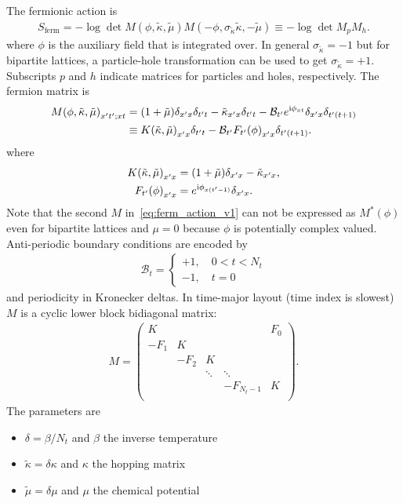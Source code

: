 \documentclass[a4paper, fleqn, twoside, notitlepage]{scrartcl}
\begin{document}
The fermionic action is
\begin{align}
  S_\text{ferm} = - \log \det M(\phi, \tilde{\kappa}, \tilde{\mu}) M(-\phi, \sigma_{\tilde{\kappa}}\tilde{\kappa}, -\tilde{\mu}) \equiv - \log \det M_p M_h.\label{eq:ferm_action_v1}
\end{align}
where $\phi$ is the auxiliary field that is integrated over. In general $\sigma_{\tilde{\kappa}} = -1$ but for bipartite lattices, a particle-hole transformation can be used to get $\sigma_{\tilde{\kappa}} = +1$. Subscripts $p$ and $h$ indicate matrices for particles and holes, respectively. The fermion matrix is
\begin{align}
  {M(\phi, \tilde{\kappa}, \tilde{\mu})}_{x't';xt}
  &= (1+\tilde{\mu})\delta_{x'x}\delta_{t't} - \tilde{\kappa}_{x'x}\delta_{t't} - \mathcal{B}_{t'} e^{\mathrm{i}\phi_{xt}}\delta_{x'x}\delta_{t'(t+1)}\label{eq:def_m}\\
  &\equiv {K(\tilde{\kappa}, \tilde{\mu})}_{x'x}\delta_{t't} - \mathcal{B}_{t'}{F_{t'}(\phi)}_{x'x}\delta_{t'(t+1)}.
\end{align}
where
\begin{align}
  {K(\tilde{\kappa}, \tilde{\mu})}_{x'x} &= (1+\tilde{\mu})\delta_{x'x} - \tilde{\kappa}_{x'x},\\
  {F_{t'}(\phi)}_{x'x} &= e^{\mathrm{i}\phi_{x(t'-1)}}\delta_{x'x}.
\end{align}
Note that the second $M$ in~\eqref{eq:ferm_action_v1} can not be expressed as $M^*(\phi)$ even for bipartite lattices and $\mu=0$ because $\phi$ is potentially complex valued.
Anti-periodic boundary conditions are encoded by
\begin{align}
  \mathcal{B}_t =
  \begin{cases}
    +1,\quad 0 < t < N_t\\
    -1,\quad t = 0
  \end{cases}
\end{align}
and periodicity in Kronecker deltas.
In time-major layout (time index is slowest) $M$ is a cyclic lower block bidiagonal matrix:
\begin{align}
  M =
  \begin{pmatrix}
    K    &      &        &        & F_0 \\
    -F_1 & K    &        &        &     \\
         & -F_2 & K      &        &     \\
         &      & \ddots & \ddots &     \\
         &      &        &-F_{N_t-1}&K   \\
  \end{pmatrix}.\label{eq:ferm_mat_block_v1}
\end{align}
The parameters are
\begin{itemize}
\item $\delta = \beta / N_t$ and $\beta$ the inverse temperature
\item $\tilde{\kappa} = \delta\kappa$ and $\kappa$ the hopping matrix
\item $\tilde{\mu} = \delta\mu$ and $\mu$ the chemical potential
\end{itemize}
\end{document}
